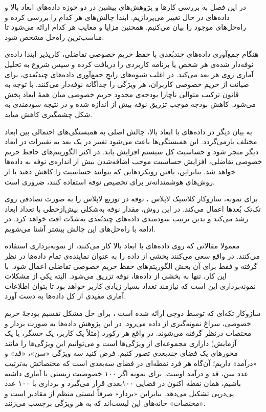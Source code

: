 

در این فصل به بررسی کارها و پژوهش‌های پیشین در دو حوزه داده‌های ابعاد بالا و داده‌های در حال تغییر می‌پردازیم. ابتدا چالش‌های هر کدام را بررسی کرده و راه‌حل‌های موجود را بیان می‌کنیم. همچنین مزایا و معایب هر کدام ارائه می‌شود تا مناسب‌ترین راه‌حل مشخص شود.


هنگام جمع‌آوری داده‌های چندبُعدی با حفظ حریم خصوصی تفاضلی، کارپذیر ابتدا داده‌ی نوفه‌دار شده‌ی هر شخص یا برنامه کاربردی را دریافت کرده و سپس شروع به تحلیل آماری روی هر بعد می‌کند. در اغلب شیوه‌های رایجِ جمع‌آوری داده‌های چندبُعدی، برای صیانت از حریم خصوصی کاربران، هر ویژگی را جداگانه نوفه‌دار می‌کنند. با توجه به قانون ترکیب متوالی ناچارا بودجه‌ی محدود حریم خصوصی میان همهٔ ابعاد پخش می‌شود. کاهش بودجه موجب تزریق نوفه بیش از اندازه شده و در نتیجه سودمندی به شکل چشمگیری کاهش میابد.

به بیان دیگر در داده‌های با ابعاد بالا، چالش اصلی به همبستگی‌های احتمالی بین ابعاد مختلف بازمی‌گردد. این همبستگی‌ها باعث می‌شود تغییر در یک بعد به تغییرات در ابعاد دیگر منجر شود و حساسیت کل سیستم افزایش یابد. در اکثر الگوریتم‌های حافظ حریم خصوصی تفاضلی، افزایش حساسیت موجب اضافه‌شدن بیش از انداره‌ی نوفه به داده‌ها خواهد شد. بنابراین، یافتن رویکردهایی که بتوانند حساسیت را کاهش دهند یا از روش‌های هوشمندانه‌تر برای تخصیص نوفه استفاده کنند، ضروری است. 

برای نمونه، سازوکار کلاسیک لاپلاس ، نوفه در توزیع لاپلاس را به صورت تصادفی روی تک‌تک بُعدها اعمال می‌کند. در این روش، مقدار نوفه به‌شکلی بیش‌ازخطی با تعداد ابعاد رشد می‌کند و بدین ترتیب سودمندی داده‌های چندبُعدی به‌شدّت افت خواهد کرد. در ادامه با راه‌حل‌های این چالش بیشتر آشنا می‌شویم.


معمولا مقالاتی که روی داده‌های با ابعاد بالا کار می‌کنند، از نمونه‌برداری استفاده می‌کنند. در واقع سعی می‌کنند بخشی از داده را به عنوان نماینده‌ی تمام داده‌ها در نظر گرفته و فقط برای آن بخش الگوریتم‌های حفظ حریم خصوصی تفاضلی اعمال شود. با این کار، تنها به بخشی از داده‌ها، نوفه تزریق می‌شود. البته یکی از مشکلات نمونه‌برداری این است که نیازمند تعداد بسیار زیادی کاربر خواهد بود تا بتوان اطلاعات آماری مفیدی از کل داده‌ها به دست آورد.


سازوکار تکه‌ای که توسط دوچی ارائه شده است ، برای حل مشکل تقسیم بودجهٔ حریم خصوصی، سراغ نمونه‌گیری از داده می‌رود. در این پژوهش داده‌ها به صورت بردار و مختصات درنظر گرفته می‌شوند. در واقع هر رکورد (مثلاً یک کاربر، یک حسگر، یا یک آزمایش) داراری مجموعه‌ای از ویژگی‌ها است و می‌توانیم این ویژگی‌ها را مانند محورهای یک فضای چندبعدی تصور کنیم. فرض کنید سه ویژگی «سن»، «قد» و «درآمد» داریم؛ آن‌گاه هر فرد نقطه‌ای در فضای سه‌بعدی است که مختصاتش به‌ترتیب عدد سن، قد و درآمد اوست. برای نمونه اگر ۱۰۰ خصوصیت زیستی یا آماری داشته باشیم، همان نقطه اکنون در فضایی ۱۰۰‌بعدی قرار می‌گیرد و برداری با ۱۰۰ عدد پی‌درپی تشکیل می‌دهد. بنابراین «بردار» صرفاً لیستی منظم از مقادیر است و «مختصات» خانه‌های این لیست‌اند که به هر ویژگی برچسب می‌زنند. 

